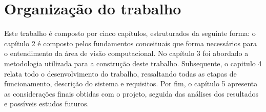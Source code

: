 \section{\textbf{Organização do trabalho}}

Este trabalho é composto por cinco capítulos, estruturados da seguinte forma: o capítulo 2 é composto pelos fundamentos conceituais que forma necessários para o entendimento da área de visão computacional. No capítulo 3 foi abordado a metodologia utilizada para a construção deste trabalho.  Subsequente, o capitulo 4 relata todo o desenvolvimento do trabalho, ressaltando todas as etapas de funcionamento, descrição do sistema e requisitos. Por fim, o capítulo 5 apresenta as considerações finais obtidas com o projeto, seguida das análises dos resultados e possíveis estudos futuros.